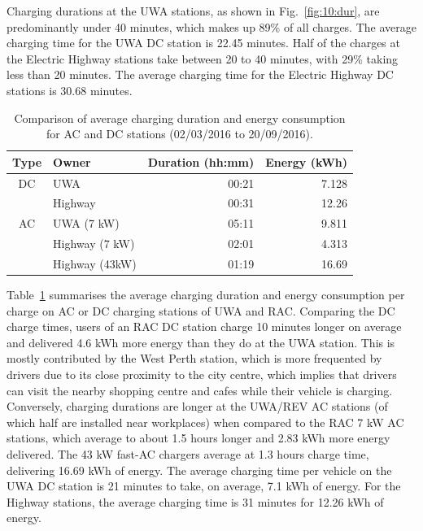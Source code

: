 Charging durations at the UWA stations, as shown in Fig.~\ref{fig:10:dur}, are predominantly under 40 minutes, which makes up 89\% of all charges. The average charging time for the UWA DC station is 22.45 minutes. Half of the charges at the Electric Highway stations take between 20 to 40 minutes, with 29\% taking less than 20 minutes. The average charging time for the Electric Highway DC stations is 30.68 minutes.

\begin{table}[H]
	\centering
	\caption[Comparison of average charging duration and energy consumption]{Comparison of average charging duration and energy consumption for AC and DC stations (02/03/2016 to 20/09/2016).}
	\label{tbl:10:acdcdur}
	\begin{tabular}{clrr}
		\toprule
		Type & Owner          & Duration (hh:mm) & Energy (kWh) \\ \midrule
		DC   & UWA            &            00:21 &        7.128 \\
		     & Highway        &            00:31 &        12.26 \\ \midrule
		AC   & UWA (7 kW)     &            05:11 &        9.811 \\
		     & Highway (7 kW) &            02:01 &        4.313 \\
		     & Highway (43kW) &            01:19 &        16.69 \\ \bottomrule
	\end{tabular}
\end{table}

Table~\ref{tbl:10:acdcdur} summarises the average charging duration and energy consumption per charge on AC or DC charging stations of UWA and RAC. Comparing the DC charge times, users of an RAC DC station charge 10 minutes longer on average and delivered 4.6 kWh more energy than they do at the UWA station. This is mostly contributed by the West Perth station, which is more frequented by drivers due to its close proximity to the city centre, which implies that drivers can visit the nearby shopping centre and cafes while their vehicle is charging. Conversely, charging durations are longer at the UWA/REV AC stations (of which half are installed near workplaces) when compared to the RAC 7 kW AC stations, which average to about 1.5 hours longer and 2.83 kWh more energy delivered. The 43 kW fast-AC chargers average at 1.3 hours charge time, delivering 16.69 kWh of energy. The average charging time per vehicle on the UWA DC station is 21 minutes to take, on average, 7.1 kWh of energy. For the Highway stations, the average charging time is 31 minutes for 12.26 kWh of energy.

